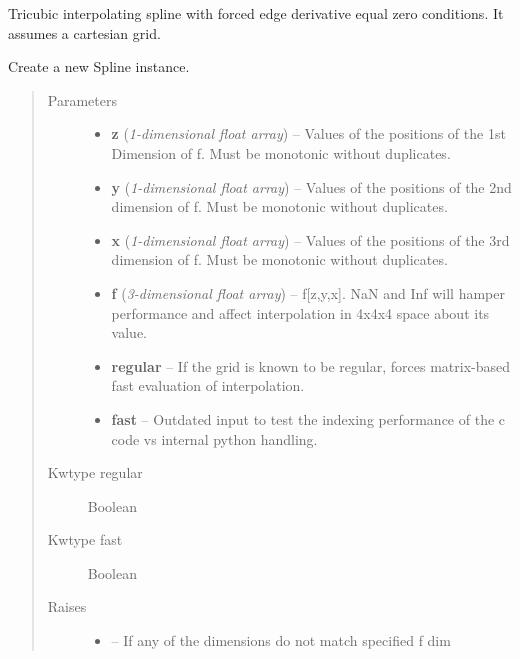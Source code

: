 \documentclass[letterpaper,10pt,english]{sphinxmanual}
\begin{document}
\begin{fulllineitems}
\label{eqtools:eqtools.trispline.Spline}
Tricubic interpolating spline with forced edge derivative equal zero
conditions.  It assumes a cartesian grid.

Create a new Spline instance.
\begin{quote}\begin{description}
\item[{Parameters}] \leavevmode\begin{itemize}
\item {} 
\textbf{z} (\emph{1-dimensional float array}) -- Values of the positions of the 1st
Dimension of f. Must be monotonic without duplicates.

\item {} 
\textbf{y} (\emph{1-dimensional float array}) -- Values of the positions of the 2nd
dimension of f. Must be monotonic without duplicates.

\item {} 
\textbf{x} (\emph{1-dimensional float array}) -- Values of the positions of the 3rd
dimension of f. Must be monotonic without duplicates.

\item {} 
\textbf{f} (\emph{3-dimensional float array}) -- f{[}z,y,x{]}. NaN and Inf will hamper
performance and affect interpolation in 4x4x4 space about its value.

\item {} 
\textbf{regular} -- If the grid is known to be regular, forces
matrix-based fast evaluation of interpolation.

\item {} 
\textbf{fast} -- Outdated input to test the indexing performance of the
c code vs internal python handling.

\end{itemize}

\item[{Kwtype regular}] \leavevmode
Boolean

\item[{Kwtype fast}] \leavevmode
Boolean

\item[{Raises}] \leavevmode\begin{itemize}
\item {} 
 -- If any of the dimensions do not match specified f dim


\end{itemize}
\end{description}
\end{quote}
\end{fulllineitems}
\end{document}
